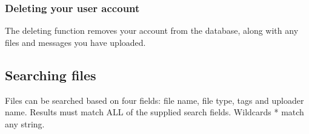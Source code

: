 \documentclass[10pt,a4paper]{article}
\begin{document}
\subsubsection{Deleting your user account}
The deleting function removes your account from the database, along with any files and messages you have uploaded.

\subsection{Searching files}
Files can be searched based on four fields: file name, file type, tags and uploader name. Results must match ALL of the supplied search fields. Wildcards * match any string.
\end{document}
